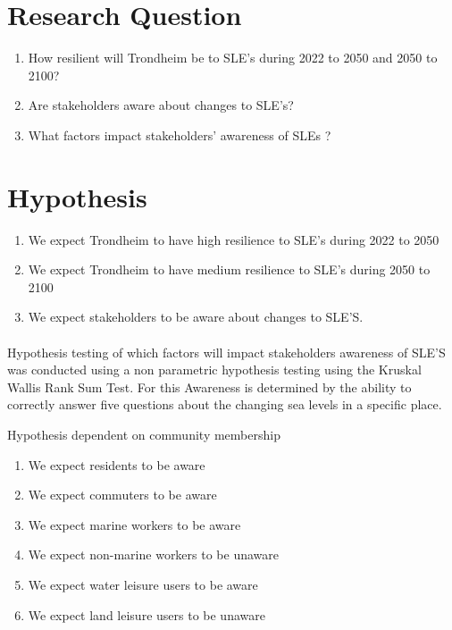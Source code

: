 \section{Research Question}
\begin{enumerate}
    \item How resilient will Trondheim be to SLE’s during 2022 to 2050 and 2050 to 2100?
    \item Are stakeholders aware about changes to SLE’s?
    \item What factors impact stakeholders’ awareness of SLEs ?
\end{enumerate}

\section{Hypothesis}

\begin{enumerate}
    \item We expect Trondheim to have high resilience to SLE's during 2022 to 2050
    \item We expect Trondheim to have medium resilience to SLE's during 2050 to 2100
    \item We expect stakeholders to be aware about changes to SLE'S.
\end{enumerate}
\paragraph{}
Hypothesis testing  of which factors will impact stakeholders awareness of SLE'S was conducted using a non parametric hypothesis testing using the Kruskal Wallis Rank Sum Test. For this Awareness is determined by the ability to correctly answer five questions about the changing sea levels in a specific place.

Hypothesis dependent on community membership
\begin{enumerate}
    \item We expect residents to be aware
    \item We expect commuters to be aware
    \item We expect marine workers to be aware
    \item We expect non-marine workers to be unaware
    \item We expect water leisure users to be aware
    \item We expect land leisure users to be unaware
    \end{enumerate}
\paragraph{}

